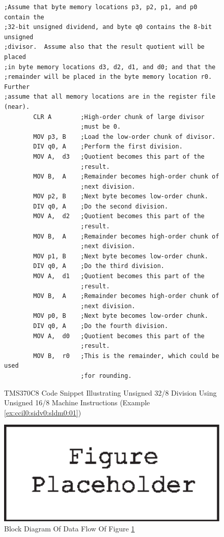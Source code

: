 \begin{figure}
\begin{verbatim}
;Assume that byte memory locations p3, p2, p1, and p0 contain the
;32-bit unsigned dividend, and byte q0 contains the 8-bit unsigned
;divisor.  Assume also that the result quotient will be placed
;in byte memory locations d3, d2, d1, and d0; and that the
;remainder will be placed in the byte memory location r0.  Further
;assume that all memory locations are in the register file (near).
        CLR A        ;High-order chunk of large divisor
                     ;must be 0.
        MOV p3, B    ;Load the low-order chunk of divisor.
        DIV q0, A    ;Perform the first division.
        MOV A,  d3   ;Quotient becomes this part of the
                     ;result.
        MOV B,  A    ;Remainder becomes high-order chunk of
                     ;next division.
        MOV p2, B    ;Next byte becomes low-order chunk.
        DIV q0, A    ;Do the second division.
        MOV A,  d2   ;Quotient becomes this part of the
                     ;result.
        MOV B,  A    ;Remainder becomes high-order chunk of
                     ;next division.
        MOV p1, B    ;Next byte becomes low-order chunk.
        DIV q0, A    ;Do the third division.
        MOV A,  d1   ;Quotient becomes this part of the
                     ;result.
        MOV B,  A    ;Remainder becomes high-order chunk of
                     ;next division.
        MOV p0, B    ;Next byte becomes low-order chunk.
        DIV q0, A    ;Do the fourth division.
        MOV A,  d0   ;Quotient becomes this part of the
                     ;result.
        MOV B,  r0   ;This is the remainder, which could be used
                     ;for rounding.
\end{verbatim}
\caption{TMS370C8 Code Snippet Illustrating Unsigned 32/8 
         Division Using Unsigned 16/8
         Machine Instructions (Example \ref{ex:ccil0:sidv0:sldm0:01})}
\label{fig:ex:ccil0:sidv0:sldm0:01:01}
\end{figure}

\begin{figure}
\centering
\includegraphics[width=4.6in]{c_cil0/t370dmp.eps}
\caption{Block Diagram Of Data Flow Of Figure \ref{fig:ex:ccil0:sidv0:sldm0:01:01}}
\label{fig:ex:ccil0:sidv0:sldm0:01:02}
\end{figure}


